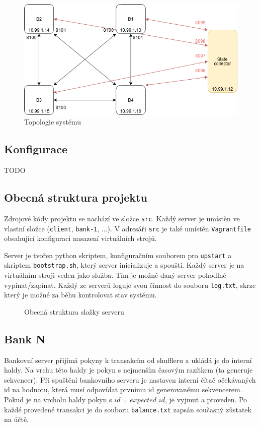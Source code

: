\documentclass[11pt,a4paper]{scrartcl}
\begin{document}
	\begin{figure}[H]
		\centering
		\includegraphics[width=15cm]{img/topologie.png}
		\caption{Topologie systému}
		\label{fig:topology.pdf_tex}
	\end{figure}

	\subsection{Konfigurace}
	TODO
	
	\subsection{Obecná struktura projektu}
	Zdrojové kódy projektu se nachází ve složce \verb|src|. Každý server je umístěn ve vlastní složce (\verb|client|, \verb|bank-1|, ...). V adresáři \verb|src| je také umístěn \verb|Vagrantfile| obsahující konfiguraci nasazení virtuálních strojů. 
	
	Server je tvořen python skriptem, konfiguračním souborem pro \verb|upstart| a skriptem \verb|bootstrap.sh|, který server inicializuje a spouští. Každý server je na virtuálním stroji veden jako služba. Tím je možné daný server pohodlně vypínat/zapínat. 	Každý ze serverů loguje svou činnost do souboru \verb|log.txt|, skrze který je možné za běhu kontrolovat stav systému. 
	
	\begin{figure}[H]
		\centering
		\caption{Obecná struktura složky serveru}
		\label{fig:serv-struct.pdf_tex}
	\end{figure}
	
	\subsection{Bank N}
	Bankovní server přijímá pokyny k transakcím od shuffleru a ukládá je do interní haldy. Na vrchu této haldy je pokyn s nejmenším časovým razítkem (ta generuje sekvencer). Při spuštění bankovního serveru je nastaven interní čítač očekávaných id na hodnotu, která musí odpovídat prvnímu id generovanému sekvencerem. Pokud je na vrcholu haldy pokyn s $id = expected\_id$, je vyjmut a proveden. 	Po každé provedené transakci je do souboru \verb|balance.txt| zapsán současný zůstatek na účtě. 
	
\end{document}
